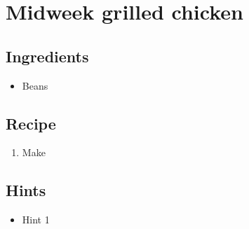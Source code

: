 \section{Midweek grilled chicken}
\subsection*{Ingredients}
\begin{itemize}
    \item Beans
\end{itemize}

\subsection*{Recipe}
\begin{enumerate}
    \item Make
\end{enumerate}

\subsection*{Hints}
\begin{itemize}
    \item Hint 1
\end{itemize}
\newpage